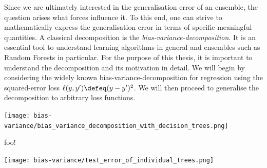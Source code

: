 \documentclass[
    a4paper, %
	fontsize=10pt, %
	twoside=false, %
]{kaobook}
\begin{document}
Since we are ultimately interested in the generalisation error of an ensemble, the question arises what forces influence it. To this end, one can strive to mathematically express the generalisation error in terms of specific meaningful quantities. A classical decomposition is the \textit{bias-variance-decomposition}. 
It is an essential tool to understand learning algorithms in general and ensembles such as Random Forests in particular. For the purpose of this thesis, it is important to understand the decomposition and its motivation in detail. 
We will begin by considering the widely known bias-variance-decomposition for regression using the squared-error loss $\ell(y, y') \defeq (y- y')^2$. We will then proceed to generalise the decomposition to arbitrary loss functions.

\begin{marginfigure} \label{fig:bias-variance-tradeoff}
    \texttt{[image: bias-variance/bias\_variance\_decomposition\_with\_decision\_trees.png]}
    \caption{foo!}
\end{marginfigure}


\begin{marginfigure} \label{fig:variance-trees}
    \texttt{[image: bias-variance/test\_error\_of\_individual\_trees.png]}
    \caption{
    Visualising the variance of \textcolor{blue}{Decision Tree} and \textcolor{orange}{Random Forest} models. Each glyph corresponds to the test error of one model trained on a random subset of the full available data. The variation of the test error around the mean test error across many dataset samples is exactly the variance.
    Not only do Random Forests show lower test errors on average, they seem to also have lower variance. We will explain this observation in \ref{todo}
    }
\end{marginfigure}
\end{document}

